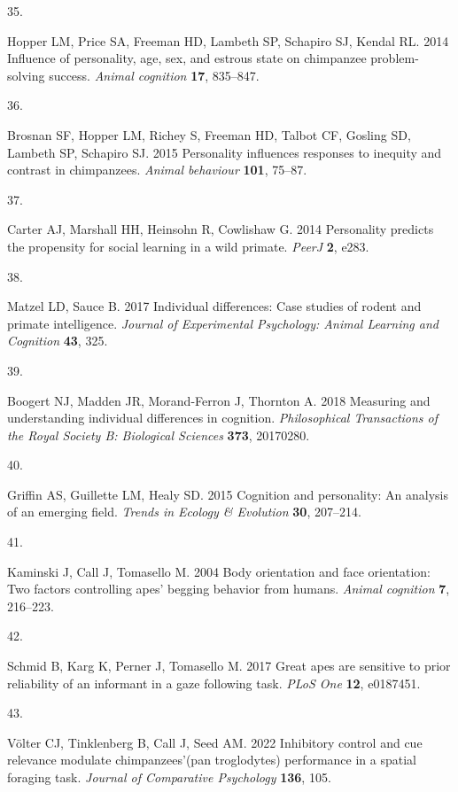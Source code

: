 \documentclass[
  man,floatsintext]{apa6}
\newlength{\cslhangindent}
\newlength{\csllabelwidth}
\newenvironment{CSLReferences}[2] %
 {\begin{list}{}{%
  \setlength{\itemindent}{0pt}
  \setlength{\leftmargin}{0pt}
  \setlength{\parsep}{0pt}
  \ifodd #1
   \setlength{\leftmargin}{\cslhangindent}
   \setlength{\itemindent}{-1\cslhangindent}
  \fi
  \setlength{\itemsep}{#2\baselineskip}}}
 {\end{list}}
\newcommand{\CSLLeftMargin}[1]{\parbox[t]{\csllabelwidth}{\strut#1\strut}}
\newcommand{\CSLRightInline}[1]{\parbox[t]{\linewidth - \csllabelwidth}{\strut#1\strut}}
\begin{document}
\begin{CSLReferences}{0}{1}
\CSLLeftMargin{35. }%
\CSLRightInline{Hopper LM, Price SA, Freeman HD, Lambeth SP, Schapiro SJ, Kendal RL. 2014 Influence of personality, age, sex, and estrous state on chimpanzee problem-solving success. \emph{Animal cognition} \textbf{17}, 835--847.}

\CSLLeftMargin{36. }%
\CSLRightInline{Brosnan SF, Hopper LM, Richey S, Freeman HD, Talbot CF, Gosling SD, Lambeth SP, Schapiro SJ. 2015 Personality influences responses to inequity and contrast in chimpanzees. \emph{Animal behaviour} \textbf{101}, 75--87.}

\CSLLeftMargin{37. }%
\CSLRightInline{Carter AJ, Marshall HH, Heinsohn R, Cowlishaw G. 2014 Personality predicts the propensity for social learning in a wild primate. \emph{PeerJ} \textbf{2}, e283.}

\CSLLeftMargin{38. }%
\CSLRightInline{Matzel LD, Sauce B. 2017 Individual differences: Case studies of rodent and primate intelligence. \emph{Journal of Experimental Psychology: Animal Learning and Cognition} \textbf{43}, 325.}

\CSLLeftMargin{39. }%
\CSLRightInline{Boogert NJ, Madden JR, Morand-Ferron J, Thornton A. 2018 Measuring and understanding individual differences in cognition. \emph{Philosophical Transactions of the Royal Society B: Biological Sciences} \textbf{373}, 20170280.}

\CSLLeftMargin{40. }%
\CSLRightInline{Griffin AS, Guillette LM, Healy SD. 2015 Cognition and personality: An analysis of an emerging field. \emph{Trends in Ecology \& Evolution} \textbf{30}, 207--214.}

\CSLLeftMargin{41. }%
\CSLRightInline{Kaminski J, Call J, Tomasello M. 2004 Body orientation and face orientation: Two factors controlling apes' begging behavior from humans. \emph{Animal cognition} \textbf{7}, 216--223.}

\CSLLeftMargin{42. }%
\CSLRightInline{Schmid B, Karg K, Perner J, Tomasello M. 2017 Great apes are sensitive to prior reliability of an informant in a gaze following task. \emph{PLoS One} \textbf{12}, e0187451.}

\CSLLeftMargin{43. }%
\CSLRightInline{Völter CJ, Tinklenberg B, Call J, Seed AM. 2022 Inhibitory control and cue relevance modulate chimpanzees'(pan troglodytes) performance in a spatial foraging task. \emph{Journal of Comparative Psychology} \textbf{136}, 105.}


\end{CSLReferences}
\end{document}
